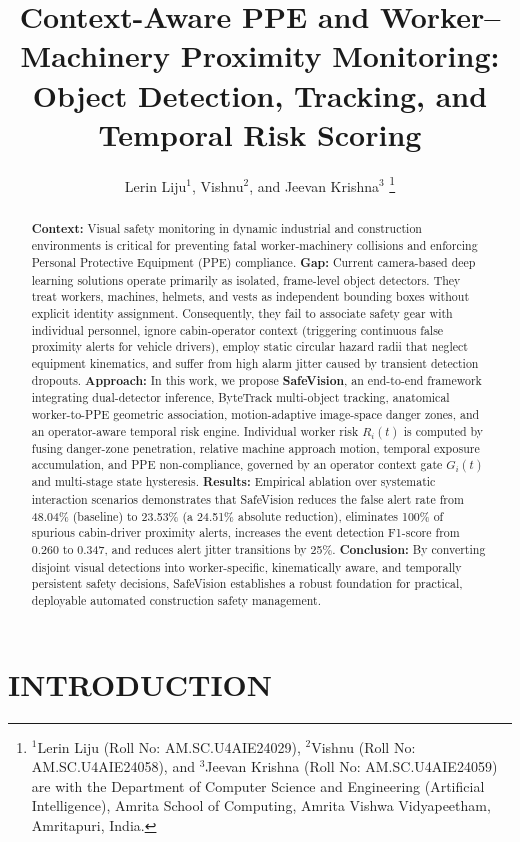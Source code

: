 \documentclass[letterpaper, 10 pt, conference]{ieeeconf}
\title{\LARGE \bf
Context-Aware PPE and Worker--Machinery Proximity Monitoring:\\
Object Detection, Tracking, and Temporal Risk Scoring
}
\author{Lerin Liju$^{1}$, Vishnu$^{2}$, and Jeevan Krishna$^{3}$%
\thanks{$^{1}$Lerin Liju (Roll No: AM.SC.U4AIE24029), $^{2}$Vishnu (Roll No: AM.SC.U4AIE24058), and $^{3}$Jeevan Krishna (Roll No: AM.SC.U4AIE24059) are with the Department of Computer Science and Engineering (Artificial Intelligence), Amrita School of Computing, Amrita Vishwa Vidyapeetham, Amritapuri, India.}%
}
\begin{document}
\maketitle
\thispagestyle{empty}
\pagestyle{empty}

\begin{abstract}
\textbf{Context:} Visual safety monitoring in dynamic industrial and construction environments is critical for preventing fatal worker-machinery collisions and enforcing Personal Protective Equipment (PPE) compliance.
\textbf{Gap:} Current camera-based deep learning solutions operate primarily as isolated, frame-level object detectors. They treat workers, machines, helmets, and vests as independent bounding boxes without explicit identity assignment. Consequently, they fail to associate safety gear with individual personnel, ignore cabin-operator context (triggering continuous false proximity alerts for vehicle drivers), employ static circular hazard radii that neglect equipment kinematics, and suffer from high alarm jitter caused by transient detection dropouts.
\textbf{Approach:} In this work, we propose \textbf{SafeVision}, an end-to-end framework integrating dual-detector inference, ByteTrack multi-object tracking, anatomical worker-to-PPE geometric association, motion-adaptive image-space danger zones, and an operator-aware temporal risk engine. Individual worker risk $R_i(t)$ is computed by fusing danger-zone penetration, relative machine approach motion, temporal exposure accumulation, and PPE non-compliance, governed by an operator context gate $G_i(t)$ and multi-stage state hysteresis.
\textbf{Results:} Empirical ablation over systematic interaction scenarios demonstrates that SafeVision reduces the false alert rate from 48.04\% (baseline) to 23.53\% (a 24.51\% absolute reduction), eliminates 100\% of spurious cabin-driver proximity alerts, increases the event detection F1-score from 0.260 to 0.347, and reduces alert jitter transitions by 25\%.
\textbf{Conclusion:} By converting disjoint visual detections into worker-specific, kinematically aware, and temporally persistent safety decisions, SafeVision establishes a robust foundation for practical, deployable automated construction safety management.
\end{abstract}

\section{INTRODUCTION}
\end{document}

